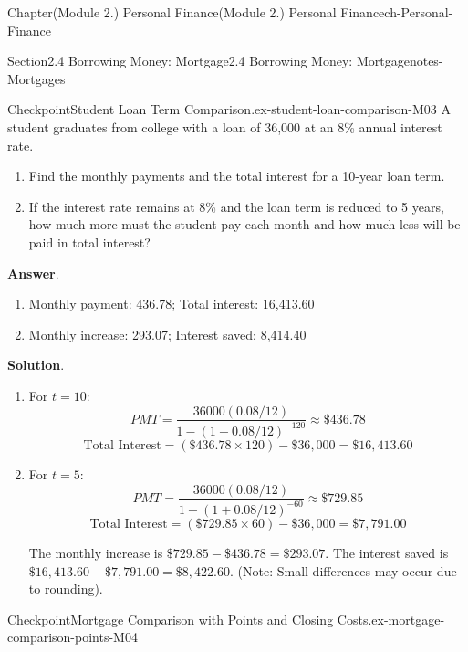 \documentclass[oneside,10pt,]{book}
\newcommand{\blocktitlefont}{\relax}
\begin{document}
\begin{chapterptx}{Chapter}{(Module 2.) Personal Finance}{}{(Module 2.) Personal Finance}{}{}{ch-Personal-Finance}
\begin{sectionptx}{Section}{2.4 Borrowing Money: Mortgage}{}{2.4 Borrowing Money: Mortgage}{}{}{notes-Mortgages}
\begin{inlineexercise}{Checkpoint}{Student Loan Term Comparison.}{ex-student-loan-comparison-M03}
A student graduates from college with a loan of \textdollar{}36,000 at an 8\% annual interest rate.%
%
\begin{enumerate}
\item{}Find the monthly payments and the total interest for a 10-year loan term.%
\item{}If the interest rate remains at 8\% and the loan term is reduced to 5 years, how much more must the student pay each month and how much less will be paid in total interest?%
\end{enumerate}
\par\smallskip%
\noindent\textbf{\blocktitlefont Answer}.\hypertarget{ex-student-loan-comparison-M03-3}{}\quad{}%
\begin{enumerate}
\item{}Monthly payment: \textdollar{}436.78; Total interest: \textdollar{}16,413.60%
\item{}Monthly increase: \textdollar{}293.07; Interest saved: \textdollar{}8,414.40%
\end{enumerate}
%
\par\smallskip%
\noindent\textbf{\blocktitlefont Solution}.\hypertarget{ex-student-loan-comparison-M03-4}{}\quad{}%
\begin{enumerate}
\item{}For \(t = 10\):%
\begin{equation*}
PMT = \frac{36000(0.08/12)}{1-(1+0.08/12)^{-120}} \approx \$436.78
\end{equation*}
%
\begin{equation*}
\text{Total Interest} = (\$436.78 \times 120) - \$36,000 = \$16,413.60
\end{equation*}
%
\item{}For \(t = 5\):%
\begin{equation*}
PMT = \frac{36000(0.08/12)}{1-(1+0.08/12)^{-60}} \approx \$729.85
\end{equation*}
%
\begin{equation*}
\text{Total Interest} = (\$729.85 \times 60) - \$36,000 = \$7,791.00
\end{equation*}
%
\par
The monthly increase is \(\$729.85 - \$436.78 = \$293.07\). The interest saved is \(\$16,413.60 - \$7,791.00 = \$8,422.60\). (Note: Small differences may occur due to rounding).%
\end{enumerate}
\end{inlineexercise}%
\begin{inlineexercise}{Checkpoint}{Mortgage Comparison with Points and Closing Costs.}{ex-mortgage-comparison-points-M04}%

\end{inlineexercise}
\end{sectionptx}
\end{chapterptx}
\end{document}
